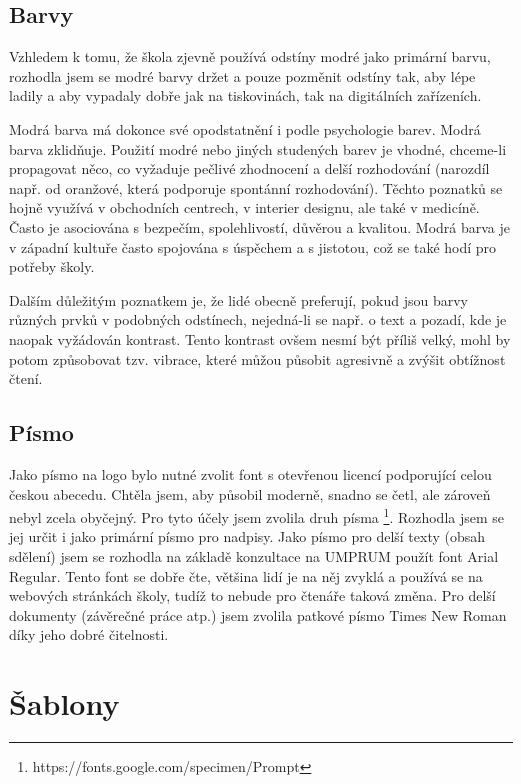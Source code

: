 \documentclass[11pt,a4paper,twoside,openright]{report}
\begin{document}
\subsection{Barvy}
Vzhledem k tomu, že škola zjevně používá odstíny modré jako primární barvu, rozhodla jsem se modré barvy držet a pouze pozměnit odstíny tak, aby lépe ladily a aby vypadaly dobře jak na tiskovinách, tak na digitálních zařízeních.

Modrá barva má dokonce své opodstatnění i podle psychologie barev. Modrá barva zklidňuje. Použití modré nebo jiných studených barev je vhodné, chceme-li propagovat něco, co vyžaduje pečlivé zhodnocení a delší rozhodování (narozdíl např. od oranžové, která podporuje spontánní rozhodování). Těchto poznatků se hojně využívá v obchodních centrech, v interier designu, ale také v medicíně.
\cite{enwiki:1144176285}
Často je asociována s bezpečím, spolehlivostí, důvěrou a kvalitou.\cite{hallock}
Modrá barva je v západní kultuře často spojována s úspěchem a s jistotou, což se také hodí pro potřeby školy. \cite{grafika}

Dalším důležitým poznatkem je, že lidé obecně preferují, pokud jsou barvy různých prvků v podobných odstínech, nejedná-li se např. o text a pozadí, kde je naopak vyžádován kontrast.\cite{enwiki:1144176285}\cite{color} Tento kontrast ovšem nesmí být příliš velký, mohl by potom způsobovat tzv. vibrace, které můžou působit agresivně a zvýšit obtížnost čtení.\cite{grafika}

\subsection{Písmo}
Jako písmo na logo bylo nutné zvolit font s otevřenou licencí podporující celou českou abecedu. Chtěla jsem, aby působil moderně, snadno se četl, ale zároveň nebyl zcela obyčejný. Pro tyto účely jsem zvolila druh písma \footnote{https://fonts.google.com/specimen/Prompt}. Rozhodla jsem se jej určit i jako primární písmo pro nadpisy.
Jako písmo pro delší texty (obsah sdělení) jsem se rozhodla na základě konzultace na UMPRUM použít font Arial Regular. Tento font se dobře čte, většina lidí je na něj zvyklá a používá se na webových stránkách školy, tudíž to nebude pro čtenáře taková změna.
Pro delší dokumenty (závěrečné práce atp.) jsem zvolila patkové písmo Times New Roman díky jeho dobré čitelnosti.

\section{Šablony}
\end{document}
